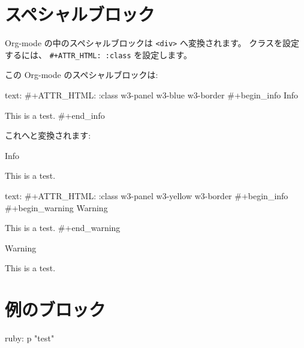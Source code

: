 \documentclass[dvipdfmx,a4j,14pt,uplatex,openany]{jsbook}
\begin{document}
\section{スペシャルブロック}
\label{sec:org40f1366}
Org-mode の中のスペシャルブロックは \texttt{<div>} へ変換されます。
クラスを設定するには、 \texttt{\#+ATTR\_HTML: :class} を設定します。 

この Org-mode のスペシャルブロックは:

\begin{programlist}[label={nil}]{text}{: }#+ATTR_HTML: :class w3-panel w3-blue w3-border
#+begin_info
Info 

This is a test.
#+end_info
\end{programlist}

これへと変換されます:

\begin{info}
Info 

This is a test.
\end{info}

\begin{programlist}[label={nil}]{text}{: }#+ATTR_HTML: :class w3-panel w3-yellow w3-border
#+begin_info
#+begin_warning
Warning

This is a test.
#+end_warning
\end{programlist}

\begin{warning}
Warning

This is a test.
\end{warning}

\section{例のブロック}
\label{sec:orgb093244}
\begin{programlist}[label={nil}]{ruby}{: }p "test"
\end{programlist}
\end{document}
